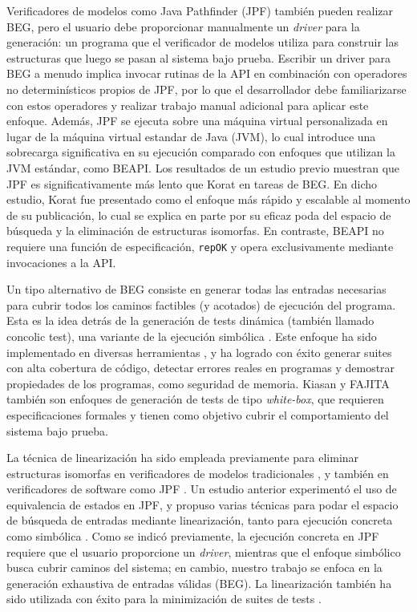 Verificadores de modelos como \textsf{Java Pathfinder} \cite{Visser05} (\textsf{JPF}) también pueden realizar BEG, pero el usuario debe proporcionar manualmente un 
\emph{driver} para la generación: un programa que el verificador de modelos utiliza para construir las estructuras que luego se pasan al sistema bajo prueba. 
Escribir un driver para BEG a menudo implica invocar rutinas de la API en combinación con operadores no determinísticos propios de \textsf{JPF}, por lo que 
el desarrollador debe familiarizarse con estos operadores y realizar trabajo manual adicional para aplicar este enfoque.
Además, \textsf{JPF} se ejecuta sobre una máquina virtual personalizada en lugar de la máquina virtual estandar de Java (\textsf{JVM}), lo cual introduce una 
sobrecarga significativa en su ejecución comparado con enfoques que utilizan la \textsf{JVM} estándar, como \textsf{BEAPI}. Los resultados de un estudio previo 
\cite{Siddiqui09} muestran que \textsf{JPF} es significativamente más lento que \textsf{Korat} en tareas de BEG. En dicho estudio, \textsf{Korat} fue presentado 
como el enfoque más rápido y escalable al momento de su publicación, lo cual se explica en parte por su eficaz poda del espacio de búsqueda y la eliminación 
de estructuras isomorfas. En contraste, \textsf{BEAPI} no requiere una función de especificación, \texttt{repOK} y opera exclusivamente mediante invocaciones a la API.

Un tipo alternativo de BEG consiste en generar todas las entradas necesarias para cubrir todos los caminos factibles (y acotados) de ejecución del programa.
Esta es la idea detrás de la generación de tests dinámica (también llamado concolic test), una variante de la ejecución 
simbólica \cite{Godefroid18}. Este enfoque ha sido implementado en diversas herramientas \cite{Godefroid12,Godefroid05,Pham19,Christakis15}, y ha logrado 
con éxito generar suites con alta cobertura de código, detectar errores reales en programas y demostrar propiedades de los programas, como seguridad de memoria.
\textsf{Kiasan} \cite{Deng06} y \textsf{FAJITA} \cite{Abad13} también son enfoques de generación de tests de tipo \emph{white-box}, que requieren especificaciones 
formales y tienen como objetivo cubrir el comportamiento del sistema bajo prueba.

La técnica de linearización ha sido empleada previamente para eliminar estructuras isomorfas en verificadores de modelos tradicionales \cite{Iosif02,Robby03}, y también 
en verificadores de software como \textsf{JPF} \cite{Visser06}. Un estudio anterior experimentó el uso de equivalencia de estados en \textsf{JPF}, y propuso varias técnicas 
para podar el espacio de búsqueda de entradas mediante linearización, tanto para ejecución concreta como simbólica \cite{Visser06}. 
Como se indicó previamente, la ejecución concreta en \textsf{JPF} requiere que el usuario proporcione un \emph{driver}, 
mientras que el enfoque simbólico busca cubrir caminos del sistema; en cambio, nuestro trabajo se enfoca en la 
generación exhaustiva de entradas válidas (BEG). 
La linearización también ha sido utilizada con éxito para la minimización de suites de tests \cite{Xie04}.